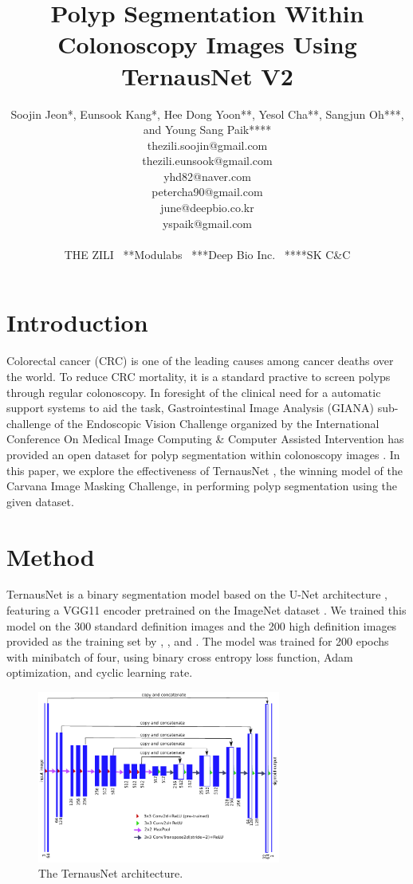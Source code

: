 \documentclass[letterpaper]{article}
\title{Polyp Segmentation Within Colonoscopy Images Using TernausNet V2}
\author{Soojin Jeon*, Eunsook Kang*, Hee Dong Yoon**, Yesol Cha**, Sangjun Oh***, and Young Sang Paik****\\
thezili.soojin@gmail.com\\
thezili.eunsook@gmail.com\\
yhd82@naver.com\\
petercha90@gmail.com\\
june@deepbio.co.kr\\
yspaik@gmail.com\\
\\
\*THE ZILI \ **Modulabs \ ***Deep Bio Inc. \ ****SK C&C
}
\begin{document}
\maketitle

\section{Introduction}

Colorectal cancer (CRC) is one of the leading causes among cancer deaths over the world. To reduce CRC mortality, it is a standard practive to screen polyps through regular colonoscopy. In foresight of the clinical need for a automatic support systems to aid the task, Gastrointestinal Image Analysis (GIANA) sub-challenge of the Endoscopic Vision Challenge organized by the International Conference On Medical Image Computing & Computer Assisted Intervention has provided an open dataset for polyp segmentation within colonoscopy images \cite{data1,data2,data3}. In this paper, we explore the effectiveness of TernausNet \cite{ternausnet}, the winning model of the Carvana Image Masking Challenge, in performing polyp segmentation using the given dataset.

\section{Method}

TernausNet is a binary segmentation model based on the U-Net architecture \cite{unet}, featuring a VGG11 \cite{vgg} encoder pretrained on the ImageNet dataset \cite{imagenet}. We trained this model on the 300 standard definition images and the 200 high definition images provided as the training set by \citeauthor{data1} , \citeauthor{data2} , and \citeauthor{data3}. The model was trained for 200 epochs with minibatch \cite{batch} of four, using binary cross entropy loss function, Adam \cite{adam} optimization, and cyclic learning rate.

\begin{figure}[h]
\includegraphics[width=8cm]{ternausnet.png}\centering
\caption{The TernausNet architecture.}
\end{figure}
\end{document}
